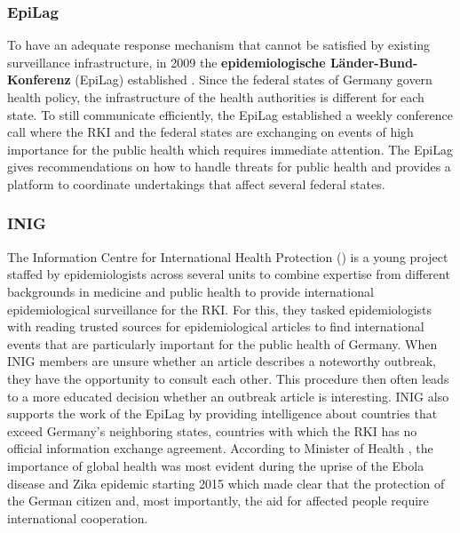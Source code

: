 \subsubsection{EpiLag}
To have an adequate response mechanism that cannot be satisfied by existing surveillance infrastructure, in 2009 the \textbf{epidemiologische L\"ander-Bund-Konferenz} (\gls{EpiLag})  established \citep{Mohr2010}.
Since the federal states of Germany govern health policy, the infrastructure of the health authorities is different for each state.
To still communicate efficiently, the EpiLag established a weekly conference call where the RKI and the federal states are exchanging on events of high importance for the public health which requires immediate attention.
The EpiLag gives recommendations on how to handle threats for public health and provides a platform to coordinate undertakings that affect several federal states.

\subsubsection{INIG}
The Information Centre for International Health Protection () is a young project staffed by epidemiologists across several units to combine expertise from different backgrounds in medicine and public health to provide international epidemiological surveillance for the RKI.
For this, they tasked epidemiologists with reading trusted sources for epidemiological articles to find international events that are particularly important for the public health of Germany.
When INIG members are unsure whether an article describes a noteworthy outbreak, they have the opportunity to consult each other.
This procedure then often leads to a more educated decision whether an outbreak article is interesting.
INIG also supports the work of the EpiLag by providing intelligence about countries that exceed Germany's neighboring states, countries with which the RKI has no official information exchange agreement.
According to Minister of Health \citeauthor{Grohe2017}, the importance of global health was most evident during the uprise of the Ebola disease and Zika epidemic starting 2015 which made clear that the protection of the German citizen and, most importantly, the aid for affected people require international cooperation.

